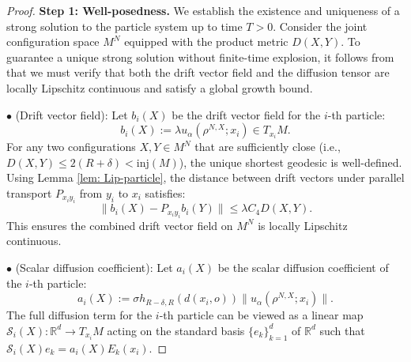\documentclass[11pt]{amsart}
\newcommand{\p}{o}%
\newcommand{\dist}{d}%
\begin{document}
\begin{proof}
\textbf{Step 1:  Well-posedness.}
We establish the existence and uniqueness of a strong solution to the particle system up to time $T>0$. Consider the joint configuration space $M^N$ equipped with the product metric $D(X, Y)$. To guarantee a unique strong solution without finite-time explosion, it follows from \cite[Theorem 1.2.9]{hsu2002stochastic} that we must verify that both the drift vector field and the diffusion tensor are locally Lipschitz continuous and satisfy a global growth bound.


$\bullet$ (Drift vector field): Let $b_i(X)$ be  the drift vector field for the $i$-th particle:
\[
b_i(X) := \lambda u_\alpha(\rho^{N, X}; x_i) \in T_{x_i}M.
\]
For any two configurations $X, Y \in M^N$ that are sufficiently close (i.e., $D(X, Y) \leq 2(R+\delta)< \mathrm{inj}(M)$), the unique shortest geodesic is well-defined. Using Lemma \ref{lem: Lip-particle}, the distance between drift vectors under parallel transport $P_{x_i y_i}$ from $y_i$ to $x_i$ satisfies:
\[
\|b_i(X) - P_{x_i y_i}b_i(Y)\| \leq \lambda C_4 D(X, Y).
\]
This ensures the combined drift vector field on $M^N$ is locally Lipschitz continuous.


$\bullet$ (Scalar diffusion coefficient): Let  $a_i(X)$ be the scalar diffusion coefficient of the $i$-th particle:
\[
a_i(X) := \sigma h_{R-\delta, R}(\dist(x_i, \p)) \|u_\alpha(\rho^{N, X}; x_i)\|.
\]
The full diffusion term for the $i$-th particle can be viewed as a linear map $\mathcal{S}_i(X) : \mathbb{R}^d \to T_{x_i}M$ acting on the standard basis $\{e_k\}_{k=1}^d$ of $\mathbb{R}^d$ such that $\mathcal{S}_i(X)e_k = a_i(X)E_k(x_i)$. 


\end{proof}
\end{document}
